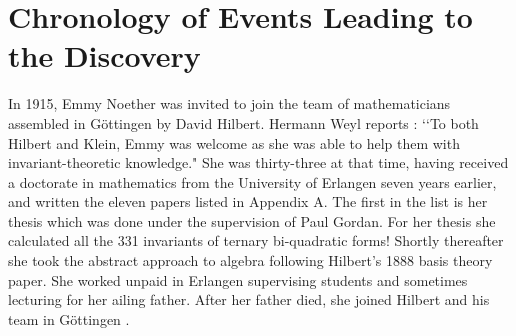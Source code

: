 \documentclass[12pt]{article}
\begin{document}
\section{Chronology of Events Leading to the Discovery}

In 1915, Emmy Noether was invited to join the team of mathematicians assembled
in G\"{o}ttingen by David Hilbert. Hermann Weyl reports \cite{weyl}: \lq\lq To
both Hilbert and Klein, Emmy was  welcome as she was able to help them with 
invariant-theoretic knowledge." She was  thirty-three at that time, having
received a doctorate in mathematics from the University of Erlangen seven years
earlier, and  written the eleven  papers listed in Appendix A. 
The first in the list is
 her thesis which was
done under  the supervision of Paul Gordan. For her thesis 
 she 
calculated  all the 331  invariants of ternary bi-quadratic forms!  Shortly
thereafter she took the abstract approach to algebra following 
 Hilbert's 1888 basis theory paper. She worked unpaid in Erlangen supervising
students and sometimes lecturing for her ailing father. After her father died,
she joined Hilbert and his team in G\"{o}ttingen \cite{Dick}.
\end{document}
